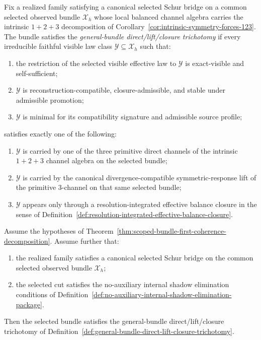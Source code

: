 \begin{definition}
\label{def:general-bundle-direct-lift-closure-trichotomy}
Fix a realized family satisfying a canonical selected Schur bridge on a common
selected observed bundle \(\mathcal X_h\) whose local balanced channel algebra
carries the intrinsic \(1+2+3\) decomposition of
Corollary~\ref{cor:intrinsic-symmetry-forces-123}. The bundle satisfies the
\emph{general-bundle direct/lift/closure trichotomy} if every irreducible
faithful visible law class \(\mathcal Y\subseteq \mathcal X_h\) such that:
\begin{enumerate}[label=(\roman*), leftmargin=2em, itemsep=0.2em]
\item the restriction of the selected visible effective law to \(\mathcal Y\)
      is exact-visible and self-sufficient;
\item \(\mathcal Y\) is reconstruction-compatible, closure-admissible, and
      stable under admissible promotion;
\item \(\mathcal Y\) is minimal for its compatibility signature and admissible
      source profile;
\end{enumerate}
satisfies exactly one of the following:
\begin{enumerate}[label=(\alph*), leftmargin=2em, itemsep=0.2em]
\item \(\mathcal Y\) is carried by one of the three primitive direct channels
      of the intrinsic \(1+2+3\) channel algebra on the selected bundle;
\item \(\mathcal Y\) is carried by the canonical divergence-compatible
      symmetric-response lift of the primitive \(3\)-channel on that same
      selected bundle;
\item \(\mathcal Y\) appears only through a resolution-integrated effective
      balance closure in the sense of
      Definition~\ref{def:resolution-integrated-effective-balance-closure}.
\end{enumerate}
\end{definition}

\begin{theorem}
\label{thm:no-auxiliary-exact-visible-restriction-forces-general-bundle-trichotomy}
Assume the hypotheses of
Theorem~\ref{thm:scoped-bundle-first-coherence-decomposition}. Assume further
that:
\begin{enumerate}[label=(\roman*), leftmargin=2em, itemsep=0.2em]
\item the realized family satisfies a canonical selected Schur bridge on the
      common selected observed bundle \(\mathcal X_h\);
\item the selected cut satisfies the no-auxiliary internal shadow elimination
      conditions of
      Definition~\ref{def:no-auxiliary-internal-shadow-elimination-package}.
\end{enumerate}
Then the selected bundle satisfies the general-bundle direct/lift/closure
trichotomy of
Definition~\ref{def:general-bundle-direct-lift-closure-trichotomy}.
\end{theorem}

